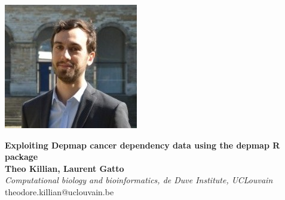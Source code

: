 \documentclass{article}
\title{}
\author{}
\date{}
\begin{document}
\begin{center}
\colorbox{lgray}{
  \begin{minipage}{3cm}
    \includegraphics[width=1.2\linewidth]{figs/theo_killian_crop.jpg}
  \end{minipage}
  \begin{minipage}{.74\textwidth}
    \begin{center}
      \huge \textbf{Exploiting Depmap cancer dependency data using the depmap R package} \\
      \vspace{0.4cm}
      \Large \textbf{Theo Killian, Laurent Gatto} \\
      \Large \textit{Computational biology and bioinformatics, de Duve Institute, UCLouvain } \\
      \vspace{0.4cm}
      \normalsize theodore.killian@uclouvain.be \\
    \end{center}
  \end{minipage}
  \begin{minipage}{3.7cm}

\end{minipage}}
\end{center}
\end{document}
